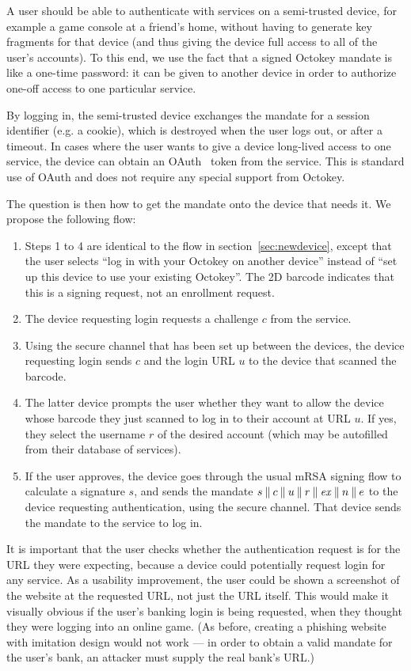 A user should be able to authenticate with services on a semi-trusted device, for example a game
console at a friend's home, without having to generate key fragments for that device (and thus
giving the device full access to all of the user's accounts). To this end, we use the fact that a
signed Octokey mandate is like a one-time password: it can be given to another device in order to
authorize one-off access to one particular service.

By logging in, the semi-trusted device exchanges the mandate for a session identifier (e.g. a
cookie), which is destroyed when the user logs out, or after a timeout. In cases where the user
wants to give a device long-lived access to one service, the device can obtain an OAuth~\cite{OAuth}
token from the service. This is standard use of OAuth and does not require any special support from
Octokey.

The question is then how to get the mandate onto the device that needs it. We propose the following
flow:

\begin{enumerate}
\item Steps 1 to 4 are identical to the flow in section~\ref{sec:newdevice}, except that the user
selects ``log in with your Octokey on another device'' instead of ``set up this device to use your
existing Octokey''. The 2D barcode indicates that this is a signing request, not an enrollment
request.
\item The device requesting login requests a challenge $c$ from the service.
\item Using the secure channel that has been set up between the devices, the device requesting login
sends $c$ and the login URL $u$ to the device that scanned the barcode.
\item The latter device prompts the user whether they want to allow the device whose barcode they
just scanned to log in to their account at URL $u$. If yes, they select the username $r$ of the
desired account (which may be autofilled from their database of services).
\item If the user approves, the device goes through the usual mRSA signing flow to calculate a
signature $s$, and sends the mandate
$s \mathbin{\|} c \mathbin{\|} u \mathbin{\|} r \mathbin{\|} \mathit{ex} \mathbin{\|} n \mathbin{\|} e$
to the device requesting authentication, using the secure channel. That device sends the mandate to
the service to log in.
\end{enumerate}

It is important that the user checks whether the authentication request is for the URL they were
expecting, because a device could potentially request login for any service. As a usability
improvement, the user could be shown a screenshot of the website at the requested URL, not just the
URL itself. This would make it visually obvious if the user's banking login is being requested, when
they thought they were logging into an online game. (As before, creating a phishing website with
imitation design would not work --- in order to obtain a valid mandate for the user's bank, an
attacker must supply the real bank's URL.)

